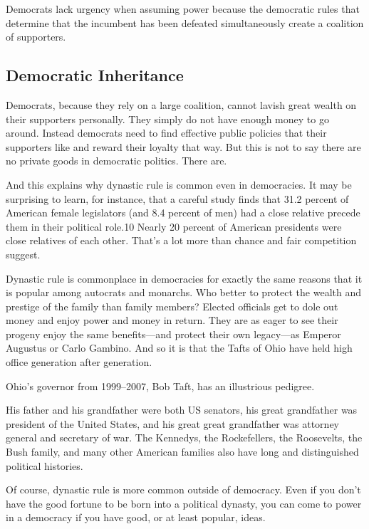\documentclass[10pt]{article}
\begin{document}
{\large Democrats lack urgency when assuming power because the democratic rules
that determine that the incumbent has been defeated simultaneously create a
coalition of supporters.}

\subsection{Democratic Inheritance}

{\large Democrats, because they rely on a large coalition, cannot lavish great
wealth on their supporters personally. They simply do not have enough money to go
around. Instead democrats need to find effective public policies that their
supporters like and reward their loyalty that way. But this is not to say there
are no private goods in democratic politics. There are.}

{\large And this explains why dynastic rule is common even in democracies. It
may be surprising to learn, for instance, that a careful study finds that 31.2
percent of American female legislators (and 8.4 percent of men) had a close
relative precede them in their political role.10 Nearly 20 percent of American
presidents were close relatives of each other. That's a lot more than chance and
fair competition suggest.}

{\large Dynastic rule is commonplace in democracies for exactly the same reasons
that it is popular among autocrats and monarchs. Who better to protect the wealth
and prestige of the family than family members? Elected officials get to dole out
money and enjoy power and money in return. They are as eager to see their progeny
enjoy the same benefits---and protect their own legacy---as Emperor Augustus or
Carlo Gambino. And so it is that the Tafts of Ohio have held high office
generation after generation.}

{\large Ohio's governor from 1999--2007, Bob Taft, has an illustrious pedigree.}

{\large His father and his grandfather were both US senators, his great
grandfather was president of the United States, and his great great grandfather
was attorney general and secretary of war. The Kennedys, the Rockefellers, the
Roosevelts, the Bush family, and many other American families also have long and
distinguished political histories.}

{\large Of course, dynastic rule is more common outside of democracy. Even if
you don't have the good fortune to be born into a political dynasty, you can come
to power in a democracy if you have good, or at least popular, ideas.}
\end{document}
